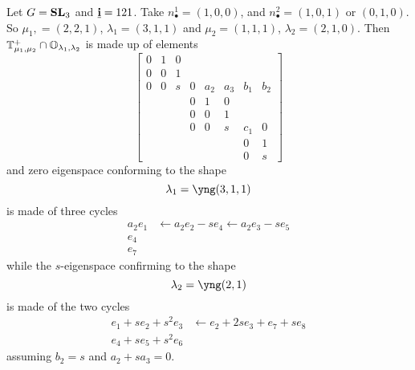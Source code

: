 \documentclass{article}
\begin{document}
\begin{example}
    Let $G = {\mathbf{SL}}_3$ and $\underline{\mathbf{i}} = 121$.
    Take $n_\bullet^1 = (1,0,0)$, and $n_\bullet^2 = (1,0,1)$ or $(0,1,0)$. So $\mu_1, = (2,2,1)$, $\lambda_1 = (3,1,1)$ and $\mu_2 = (1,1,1)$, $\lambda_2 = (2,1,0)$. 
    Then $\mathbb T_{\mu_1,\mu_2}^+\cap\mathbb O_{\lambda_1,\lambda_2}$ is made up of elements 
    \[
    \begin{bmatrix}
        0 & 1 & 0 \\
        0 & 0 & 1 \\
        0 & 0 & s & 0 & a_2 & a_3 & b_1 & b_2 \\
          &   &   & 0 & 1 & 0 \\
          &   &   & 0 & 0 & 1 \\
          &   &   & 0 & 0 & s & c_1 & 0 \\
          &   &   &   &   &   & 0 & 1 \\
          &   &   &   &   &   & 0 & s 
    \end{bmatrix}    
    \]
    and zero eigenspace conforming to the shape 
    \[
    \lambda_1 = \yng(3,1,1)    
    \] 
    is made of three cycles
    \begin{align*}
        a_2 e_1 &\leftarrow a_2e_2 - s e_4 \leftarrow a_2 e_3 - s e_5 \\
        e_4 & \\
        e_7 & 
    \end{align*}
    while the $s$-eigenspace confirming to the shape 
    \[
    \lambda_2 = \yng(2,1)    
    \]
    is made of the two cycles 
    \begin{align*}
        e_1 + se_2 +s^2 e_3 & \leftarrow e_2 + 2se_3 + e_7 + se_8 \\
        e_4 + s e_5 + s^2 e_6 & 
    \end{align*}
    assuming $b_2 = s$ and $a_2 + sa_3 = 0$.
\end{example}
\end{document}
